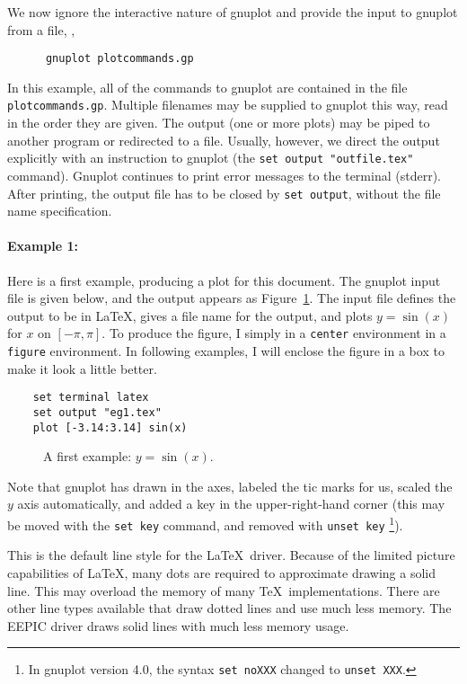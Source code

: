 We now ignore the interactive nature of gnuplot and provide the input
to gnuplot from a file, \ie,
\begin{verbatim}
      gnuplot plotcommands.gp
\end{verbatim}
In this example, all of the commands to gnuplot are contained in the
file {\tt plotcommands.gp}. Multiple filenames may be supplied to gnuplot
this way, read in the order they are given.  The output (one or more
plots) may be piped to another program or redirected to a file.
Usually, however, we direct the output explicitly with an instruction
to gnuplot (the {\tt set output "outfile.tex"} command). Gnuplot continues to
print error messages to the terminal (stderr). After printing, the output file
has to be closed by {\tt set output}, \ie{} without the file name specification.

\paragraph{Example 1:} Here is a first example, producing a plot for
this document. The gnuplot input file is given below, and the output
appears as Figure~\ref{eg1}. The input file defines the output to be
in \LaTeX, gives a file name for the output, and plots $y=\sin(x)$ for
$x$ on $[-\pi,\pi]$. To produce the figure, I simply
\verb++ in a {\tt center} environment in a {\tt figure}
environment. In following examples, I will enclose the figure in a box
to make it look a little better.

\singlespace
\begin{verbatim}
    set terminal latex
    set output "eg1.tex"
    plot [-3.14:3.14] sin(x)
\end{verbatim}
\currentspace

\begin{figure}[htbp]
  \begin{center}
    
  \end{center}
  \caption{A first example: $y=\sin(x)$.}
  \label{eg1}
\end{figure}

Note that gnuplot has drawn in the axes, labeled the tic marks for us,
scaled the $y$ axis automatically, and added a key in the
upper-right-hand corner (this may be moved with the {\tt set key}
command, and removed with {\tt unset key}%
\footnote{In gnuplot version 4.0, the syntax {\tt set noXXX} changed to
{\tt unset XXX}.}).

This is the default line style for the \LaTeX\ driver.  Because of the
limited picture capabilities of \LaTeX, many dots are required to
approximate drawing a solid line. This may overload the memory of many
\TeX\ implementations. There are other line types available that draw
dotted lines and use much less memory. The EEPIC driver draws solid
lines with much less memory usage.


